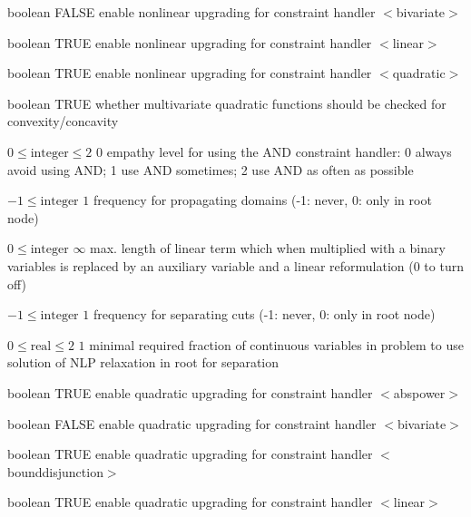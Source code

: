 %
{boolean}%
{FALSE}%
{enable nonlinear upgrading for constraint handler $<$bivariate$>$}%
{}

%
{boolean}%
{TRUE}%
{enable nonlinear upgrading for constraint handler $<$linear$>$}%
{}

%
{boolean}%
{TRUE}%
{enable nonlinear upgrading for constraint handler $<$quadratic$>$}%
{}

%
{boolean}%
{TRUE}%
{whether multivariate quadratic functions should be checked for convexity/concavity}%
{}

%
{$0\leq\textrm{integer}\leq2$}%
{$0$}%
{empathy level for using the AND constraint handler: 0 always avoid using AND; 1 use AND sometimes; 2 use AND as often as possible}%
{}

%
{$-1\leq\textrm{integer}$}%
{$1$}%
{frequency for propagating domains (-1: never, 0: only in root node)}%
{}

%
{$0\leq\textrm{integer}$}%
{$\infty$}%
{max. length of linear term which when multiplied with a binary variables is replaced by an auxiliary variable and a linear reformulation (0 to turn off)}%
{}

%
{$-1\leq\textrm{integer}$}%
{$1$}%
{frequency for separating cuts (-1: never, 0: only in root node)}%
{}

%
{$0\leq\textrm{real}\leq2$}%
{$1$}%
{minimal required fraction of continuous variables in problem to use solution of NLP relaxation in root for separation}%
{}

%
{boolean}%
{TRUE}%
{enable quadratic upgrading for constraint handler $<$abspower$>$}%
{}

%
{boolean}%
{FALSE}%
{enable quadratic upgrading for constraint handler $<$bivariate$>$}%
{}

%
{boolean}%
{TRUE}%
{enable quadratic upgrading for constraint handler $<$bounddisjunction$>$}%
{}

%
{boolean}%
{TRUE}%
{enable quadratic upgrading for constraint handler $<$linear$>$}%
{}


